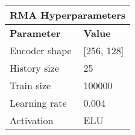 \begin{table}[h]
\begin{tabular}{|l|l|}
\hline
\multicolumn{2}{|c|}{\textbf{RMA Hyperparameters}} \\ \hline
\textbf{Parameter} & \textbf{Value} \\ \hline
Encoder shape & [256, 128] \\ \hline
History size & 25 \\ \hline
Train size & 100000 \\ \hline
Learning rate & 0.004 \\ \hline
Activation & ELU \cite{Clevert2015} \\ \hline
\end{tabular}
\end{table}